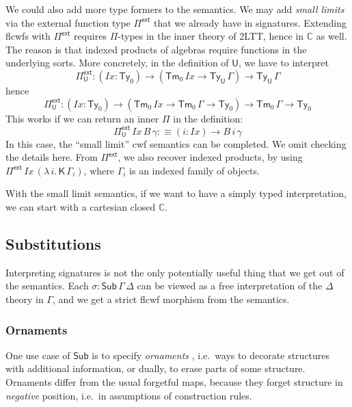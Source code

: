 \documentclass[12pt,a4paper,twoside,openany]{book}
\theoremstyle{remark}
\theoremstyle{definition}
\theoremstyle{theorem}
\newcommand{\mi}[1]{\mathit{#1}}
\newcommand{\mbb}[1]{\mathbb{#1}}
\newcommand{\bs}[1]{\boldsymbol{#1}}
\newcommand{\Ix}{\mi{Ix}}
\newcommand{\Sub}{\mathsf{Sub}}
\newcommand{\Tm}{\mathsf{Tm}}
\newcommand{\Ty}{\mathsf{Ty}}
\newcommand{\U}{\mathsf{U}}
\newcommand{\Pie}{\Pi^{\mathsf{ext}}}
\newcommand{\K}{\mathsf{K}}
\newcommand{\bU}{\bs{\U}}
\newcommand{\mbbC}{\mbb{C}}
\newcommand{\defn}{:\equiv}
\begin{document}
We could also add more type formers to the semantics. We may add \emph{small
  limits} via the external function type $\Pie$ that we already have in
signatures. Extending flcwfs with $\Pie$ requires $\Pi$-types in the inner
theory of 2LTT, hence in $\mbbC$ as well. The reason is that indexed products of
algebras require functions in the underlying sorts. More concretely, in the
definition of $\bU$, we have to interpret
\[
  \Pie_{\bU} : (\Ix : \Ty_0) \to (\Tm_0\,\Ix \to \Ty_{\bU}\,\Gamma) \to \Ty_{\bU}\,\Gamma
\]
hence
\[
  \Pie_{\bU} : (\Ix : \Ty_0) \to (\Tm_0\,\Ix \to \Tm_0\,\Gamma \to \Ty_0) \to \Tm_0\,\Gamma \to \Ty_0
\]
This works if we can return an inner $\Pi$ in the definition:
\[
  \Pie_{\bU}\,\Ix\,B\,\gamma \defn (i : \Ix) \to B\,i\,\gamma
\]
In this case, the ``small limit'' cwf semantics can be completed. We omit
checking the details here. From $\Pie$, we also recover indexed products, by
using $\Pie\,\Ix\,(\lambda\,i.\,\K\,\Gamma_i)$, where $\Gamma_i$ is an indexed
family of objects.

With the small limit semantics, if we want to have a simply typed
interpretation, we can start with a cartesian closed $\mbbC$.

\subsection{Substitutions}

Interpreting signatures is not the only potentially useful thing that we get out
of the semantics. Each $\sigma : \Sub\,\Gamma\,\Delta$ can be viewed as a free
interpretation of the $\Delta$ theory in $\Gamma$, and we get a strict flcwf
morphism from the semantics.

\subsubsection{Ornaments}

One use case of $\Sub$ is to specify \emph{ornaments} \cite{ornaments}, i.e.\ ways
to decorate structures with additional information, or dually, to erase parts of
some structure. Ornaments differ from the usual forgetful maps, because they
forget structure in \emph{negative} position, i.e.\ in assumptions of
construction rules.
\end{document}
